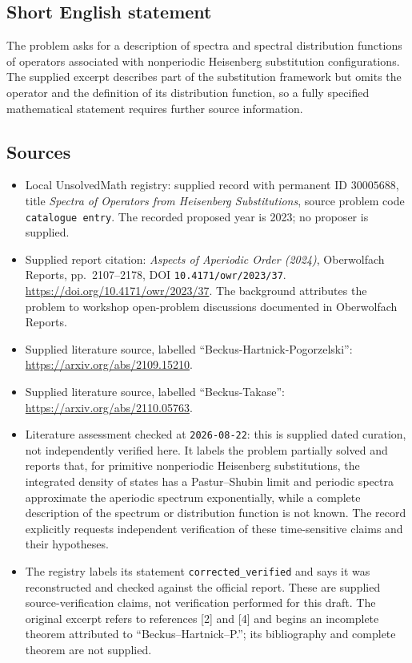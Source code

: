 \documentclass[11pt]{article}
\begin{document}
\subsection{Short English statement}
The problem asks for a description of spectra and spectral distribution functions of operators associated with nonperiodic Heisenberg substitution configurations. The supplied excerpt describes part of the substitution framework but omits the operator and the definition of its distribution function, so a fully specified mathematical statement requires further source information.
\subsection{Sources}
\begin{itemize}
\item Local UnsolvedMath registry: supplied record with permanent ID \(30005688\), title \emph{Spectra of Operators from Heisenberg Substitutions}, source problem code \texttt{catalogue entry}. The recorded proposed year is 2023; no proposer is supplied.
\item Supplied report citation: \emph{Aspects of Aperiodic Order (2024)}, Oberwolfach Reports, pp.\ 2107--2178, DOI \texttt{10.4171/owr/2023/37}. \url{https://doi.org/10.4171/owr/2023/37}. The background attributes the problem to workshop open-problem discussions documented in Oberwolfach Reports.
\item Supplied literature source, labelled ``Beckus-Hartnick-Pogorzelski'': \url{https://arxiv.org/abs/2109.15210}.
\item Supplied literature source, labelled ``Beckus-Takase'': \url{https://arxiv.org/abs/2110.05763}.
\item Literature assessment checked at \texttt{2026-08-22}: this is supplied dated curation, not independently verified here. It labels the problem partially solved and reports that, for primitive nonperiodic Heisenberg substitutions, the integrated density of states has a Pastur--Shubin limit and periodic spectra approximate the aperiodic spectrum exponentially, while a complete description of the spectrum or distribution function is not known. The record explicitly requests independent verification of these time-sensitive claims and their hypotheses.
\item The registry labels its statement \texttt{corrected\_verified} and says it was reconstructed and checked against the official report. These are supplied source-verification claims, not verification performed for this draft. The original excerpt refers to references [2] and [4] and begins an incomplete theorem attributed to ``Beckus--Hartnick--P.''; its bibliography and complete theorem are not supplied.
\end{itemize}
\end{document}
